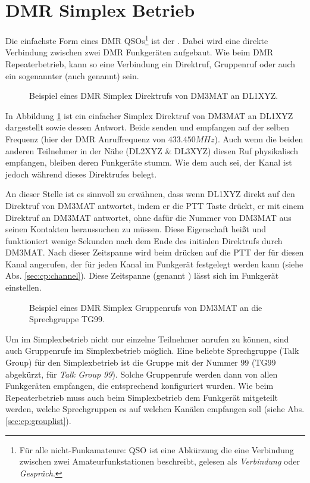 \section{DMR Simplex Betrieb} \label{sec:simplex}
Die einfachste Form eines DMR QSOs\footnote{Für alle nicht-Funkamateure: QSO ist eine Abkürzung die eine Verbindung zwischen zwei Amateurfunkstationen beschreibt, gelesen als \emph{Verbindung} oder \emph{Gespräch}.} ist der . Dabei wird eine direkte Verbindung zwischen zwei DMR Funkgeräten aufgebaut. Wie beim DMR Repeaterbetrieb, kann so eine Verbindung ein Direktruf, Gruppenruf oder auch ein sogenannter  (auch  genannt) sein. 

\begin{figure}[!ht]
 \centering
 
 \caption{Beispiel eines DMR Simplex Direktrufs von DM3MAT an DL1XYZ.} \label{fig:splxpc}
\end{figure}

In Abbildung \ref{fig:splxpc} ist ein einfacher Simplex Direktruf von DM3MAT an DL1XYZ dargestellt sowie dessen Antwort. Beide senden und empfangen auf der selben Frequenz (hier der DMR Anruffrequenz von $433.450 MHz$). Auch wenn die beiden anderen Teilnehmer in der Nähe (DL2XYZ \& DL3XYZ) diesen Ruf physikalisch empfangen, bleiben deren Funkgeräte stumm. Wie dem auch sei, der Kanal ist jedoch während dieses Direktrufes belegt. 

An dieser Stelle ist es sinnvoll zu erwähnen, dass wenn DL1XYZ direkt auf den Direktruf von DM3MAT antwortet, indem er die PTT Taste drückt, er mit einem Direktruf an DM3MAT antwortet, ohne dafür die Nummer von DM3MAT aus seinen Kontakten heraussuchen zu müssen. Diese Eigenschaft heißt  und funktioniert wenige Sekunden nach dem Ende des initialen Direktrufs durch DM3MAT. Nach dieser Zeitspanne wird beim drücken auf die PTT der  für diesen Kanal angerufen, der für jeden Kanal im Funkgerät festgelegt werden kann (siehe Abs. \ref{sec:cp:channel}). Diese Zeitspanne (genannt ) lässt sich im Funkgerät einstellen.

\begin{figure}[!ht]
  \centering
  
  \caption{Beispiel eines DMR Simplex Gruppenrufs von DM3MAT an die Sprechgruppe TG99.} \label{fig:splxgc}
\end{figure}

Um im Simplexbetrieb nicht nur einzelne Teilnehmer anrufen zu können, sind auch Gruppenrufe im Simplexbetrieb möglich. Eine beliebte Sprechgruppe (Talk Group) für den Simplexbetrieb ist die Gruppe mit der Nummer 99  (TG99 abgekürzt, für \emph{Talk Group 99}). Solche Gruppenrufe werden dann von allen Funkgeräten empfangen, die entsprechend konfiguriert wurden. Wie beim Repeaterbetrieb muss auch beim Simplexbetrieb dem Funkgerät mitgeteilt werden, welche Sprechgruppen es auf welchen Kanälen empfangen soll (siehe Abs. \ref{sec:cp:grouplist}). 

